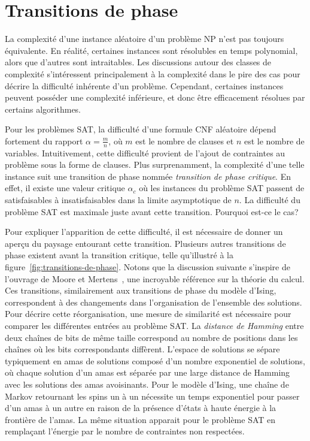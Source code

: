 
\section{Transitions de phase}
\label{sec:transitions-de-phase}

La complexité d'une instance aléatoire d'un problème \textsf{NP} n'est pas toujours équivalente. En réalité, certaines instances sont résolubles en temps polynomial, alors que d'autres sont intraitables. Les discussions autour des classes de complexité s'intéressent principalement à la complexité dans le pire des cas pour décrire la difficulté inhérente d'un problème. Cependant, certaines instances peuvent posséder une complexité inférieure, et donc être efficacement résolues par certains algorithmes. 

Pour les problèmes SAT, la difficulté d'une formule CNF aléatoire dépend fortement du rapport $\alpha = \frac{m}{n}$, où $m$ est le nombre de clauses et $n$ est le nombre de variables. Intuitivement, cette difficulté provient de l'ajout de contraintes au problème sous la forme de clauses. Plus surprenamment, la complexité d'une telle instance suit une transition de phase nommée \textit{transition de phase critique}. En effet, il existe une valeur critique $\alpha_{c}$ où les instances du problème SAT passent de satisfaisables à insatisfaisables dans la limite asymptotique de $n$. La difficulté du problème SAT est maximale juste avant cette transition. Pourquoi est-ce le cas? 

Pour expliquer l'apparition de cette difficulté, il est nécessaire de donner un aperçu du paysage entourant cette transition. Plusieurs autres transitions de phase existent avant la transition critique, telle qu'illustré à la figure~\ref{fig:transitions-de-phase}. Notons que la discussion suivante s'inspire de l'ouvrage de Moore et Mertens~\cite{mooreNatureComputation2011}, une incroyable référence sur la théorie du calcul. Ces transitions, similairement aux transitions de phase du modèle d'Ising, correspondent à des changements dans l'organisation de l'ensemble des solutions. Pour décrire cette réorganisation, une mesure de similarité est nécessaire pour comparer les différentes entrées au problème SAT. La \textit{distance de Hamming} entre deux chaînes de bits de même taille correspond au nombre de positions dans les chaînes où les bits correspondants diffèrent. L'espace de solutions se sépare typiquement en amas de solutions composé d'un nombre exponentiel de solutions, où chaque solution d'un amas est séparée par une large distance de Hamming avec les solutions des amas avoisinants. Pour le modèle d'Ising, une chaîne de Markov retournant les spins un à un nécessite un temps exponentiel pour passer d'un amas à un autre en raison de la présence d'états à haute énergie à la frontière de l'amas. La même situation apparait pour le problème SAT en remplaçant l'énergie par le nombre de contraintes non respectées.


